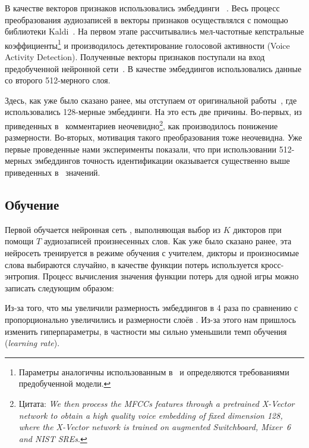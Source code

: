 В качестве векторов признаков использовались эмбеддинги
\xvector{}~\cite{xvectorspaper}. Весь процесс преобразования аудиозаписей в
векторы признаков осуществлялся с помощью библиотеки Kaldi~\cite{kaldi}. На
первом этапе рассчитывалиcь мел-частотные кепстральные коэффициенты\footnote{
    Параметры аналогичны использованным в~\cite{isrpaper} и определяются
    требованиями предобученной модели.
} и производилось детектирование голосовой
активности (Voice Activity Detection). Полученные векторы признаков поступали на
вход предобученной нейронной сети~\cite{sre16model}. В качестве эмбеддингов
использовались данные со второго 512-мерного слоя.

Здесь, как уже было сказано ранее, мы отступаем от оригинальной
работы~\cite{isrpaper}, где использовались 128-мерные эмбеддинги. На это есть
две причины. Во-первых, из приведенных в~\cite{isrpaper} комментариев
неочевидно\footnote{
    Цитата: \textit{We then process the MFCCs features through a pretrained
    X-Vector network to obtain a high quality voice embedding of fixed dimension
    128, where the X-Vector network is trained on augmented Switchboard, Mixer~6
    and NIST SREs}.
}, как производилось понижение размерности.
Во-вторых, мотивация такого преобразования тоже неочевидна. Уже первые проведенные
нами эксперименты показали, что при использовании 512-мерных эмбеддингов точность
идентификации оказывается существенно выше приведенных в~\cite{isrpaper} значений.

\subsection{Обучение \guesser{}}

Первой обучается нейронная сеть \guesser{}, выполняющая выбор из $K$ дикторов
при помощи $T$ аудиозаписей произнесенных слов. Как уже было сказано ранее, эта
нейросеть тренируется в режиме обучения с учителем, дикторы и произносимые слова
выбираются случайно, в качестве функции потерь используется кросс-энтропия.
Процесс вычисления значения функции потерь для одной игры можно записать
следующим образом:


Из-за того, что мы увеличили размерность эмбеддингов в 4 раза по сравнению 
с~\citeisr{} пропорционально увеличились и размерности слоёв \guesser{}. Из-за
этого нам пришлось изменить гиперпараметры, в частности мы сильно уменьшили темп
обучения (\textit{learning rate}).

